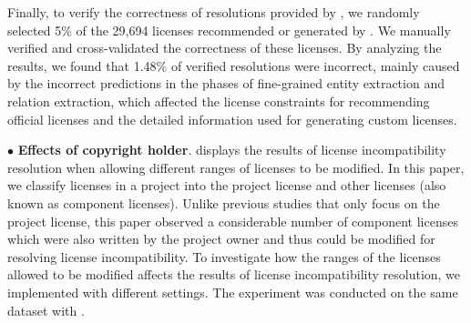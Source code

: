 Finally, to verify the correctness of resolutions provided by \tool, we randomly selected 5\% of the {29,694} licenses recommended or generated by \tool. We manually verified and cross-validated the correctness of these licenses. 
By analyzing the results, {we found that {1.48\%} of verified resolutions were incorrect, mainly caused by the incorrect predictions in the phases of fine-grained entity extraction and relation extraction, which affected the license constraints for recommending official licenses and the detailed information used for generating custom licenses. }



\noindent $\bullet$ \textbf{Effects of copyright holder}.  displays the results of license incompatibility resolution when allowing different ranges of licenses to be modified. In this paper, we classify licenses in a project into the project license and other licenses (also known as component licenses). Unlike previous studies that only focus on the project license, this paper observed a considerable number of component licenses which were also written by the project owner and thus could be modified for resolving license incompatibility. To investigate how the ranges of the licenses allowed to be modified affects the results of license incompatibility resolution, we implemented \tool with different settings. The experiment was conducted on the same dataset with .

